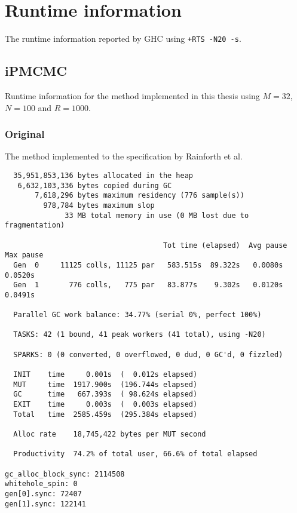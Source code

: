 \onecolumn
\appendix

\section{Runtime information}
\label{sec:runtime}


The runtime information reported by GHC using \texttt{+RTS -N20 -s}.

\subsection{iPMCMC}
\label{sub:ipmcmc_original}

Runtime information for the method implemented in this thesis using $M=32$, $N=100$ and $R=1000$.

\subsubsection{Original}
\label{ssub:original}

The method implemented to the specification by Rainforth et al.
\begin{verbatim}
  35,951,853,136 bytes allocated in the heap
   6,632,103,336 bytes copied during GC
       7,618,296 bytes maximum residency (776 sample(s))
         978,784 bytes maximum slop
              33 MB total memory in use (0 MB lost due to fragmentation)

                                     Tot time (elapsed)  Avg pause  Max pause
  Gen  0     11125 colls, 11125 par   583.515s  89.322s   0.0080s    0.0520s
  Gen  1       776 colls,   775 par   83.877s    9.302s   0.0120s    0.0491s

  Parallel GC work balance: 34.77% (serial 0%, perfect 100%)

  TASKS: 42 (1 bound, 41 peak workers (41 total), using -N20)

  SPARKS: 0 (0 converted, 0 overflowed, 0 dud, 0 GC'd, 0 fizzled)

  INIT    time     0.001s  (  0.012s elapsed)
  MUT     time  1917.900s  (196.744s elapsed)
  GC      time   667.393s  ( 98.624s elapsed)
  EXIT    time     0.003s  (  0.003s elapsed)
  Total   time  2585.459s  (295.384s elapsed)

  Alloc rate    18,745,422 bytes per MUT second

  Productivity  74.2% of total user, 66.6% of total elapsed

gc_alloc_block_sync: 2114508
whitehole_spin: 0
gen[0].sync: 72407
gen[1].sync: 122141
\end{verbatim}


